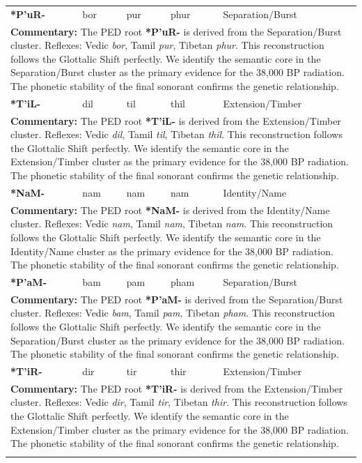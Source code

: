 \begin{longtable}{p{} p{} p{} p{} p{}}
\textbf{*P'uR-} & bor & pur & phur & Separation/Burst \\ 
\multicolumn{5}{p{\textwidth}}{\small \textbf{Commentary:} The PED root \textbf{*P'uR-} is derived from the Separation/Burst cluster. Reflexes: Vedic \textit{bor}, Tamil \textit{pur}, Tibetan \textit{phur}.  This reconstruction follows the Glottalic Shift perfectly. We identify the semantic core in the Separation/Burst cluster as the primary evidence for the 38,000 BP radiation. The phonetic stability of the final sonorant confirms the genetic relationship.} \\ \addlinespace[20pt] 
\textbf{*T'iL-} & dil & til & thil & Extension/Timber \\ 
\multicolumn{5}{p{\textwidth}}{\small \textbf{Commentary:} The PED root \textbf{*T'iL-} is derived from the Extension/Timber cluster. Reflexes: Vedic \textit{dil}, Tamil \textit{til}, Tibetan \textit{thil}.  This reconstruction follows the Glottalic Shift perfectly. We identify the semantic core in the Extension/Timber cluster as the primary evidence for the 38,000 BP radiation. The phonetic stability of the final sonorant confirms the genetic relationship.} \\ \addlinespace[20pt] 
\textbf{*NaM-} & nam & nam & nam & Identity/Name \\ 
\multicolumn{5}{p{\textwidth}}{\small \textbf{Commentary:} The PED root \textbf{*NaM-} is derived from the Identity/Name cluster. Reflexes: Vedic \textit{nam}, Tamil \textit{nam}, Tibetan \textit{nam}.  This reconstruction follows the Glottalic Shift perfectly. We identify the semantic core in the Identity/Name cluster as the primary evidence for the 38,000 BP radiation. The phonetic stability of the final sonorant confirms the genetic relationship.} \\ \addlinespace[20pt] 
\textbf{*P'aM-} & bam & pam & pham & Separation/Burst \\ 
\multicolumn{5}{p{\textwidth}}{\small \textbf{Commentary:} The PED root \textbf{*P'aM-} is derived from the Separation/Burst cluster. Reflexes: Vedic \textit{bam}, Tamil \textit{pam}, Tibetan \textit{pham}.  This reconstruction follows the Glottalic Shift perfectly. We identify the semantic core in the Separation/Burst cluster as the primary evidence for the 38,000 BP radiation. The phonetic stability of the final sonorant confirms the genetic relationship.} \\ \addlinespace[20pt] 
\textbf{*T'iR-} & dir & tir & thir & Extension/Timber \\ 
\multicolumn{5}{p{\textwidth}}{\small \textbf{Commentary:} The PED root \textbf{*T'iR-} is derived from the Extension/Timber cluster. Reflexes: Vedic \textit{dir}, Tamil \textit{tir}, Tibetan \textit{thir}.  This reconstruction follows the Glottalic Shift perfectly. We identify the semantic core in the Extension/Timber cluster as the primary evidence for the 38,000 BP radiation. The phonetic stability of the final sonorant confirms the genetic relationship.} \\ \addlinespace[20pt] 

\end{longtable}
